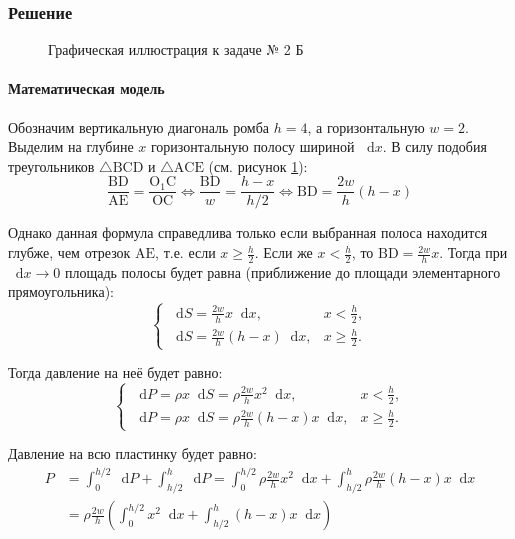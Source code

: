 \documentclass[a4paper,12pt]{article}
\newcommand*\diff{\mathop{}\!\mathrm{d}}
\begin{document}
\subsubsection{Решение}

\begin{figure}[htbp]
  \centering
  \caption{Графическая иллюстрация к задаче № 2 Б}\label{fig:2b}
\end{figure}

\paragraph{Математическая модель}

Обозначим вертикальную диагональ ромба \(h = 4\), а горизонтальную \(w = 2\).
Выделим на глубине \(x\) горизонтальную полосу шириной \(\diff x\).
В силу подобия треугольников
\(\triangle \mathrm{BCD}\) и \(\triangle \mathrm{ACE}\)
(см. рисунок \ref{fig:2b}):
\[
  \frac{\mathrm{BD}}{\mathrm{AE}} = \frac{\mathrm{O_1 C}}{\mathrm{OC}}
  \Leftrightarrow
  \frac{\mathrm{BD}}{w} = \frac{h - x}{h / 2}
  \Leftrightarrow
  \mathrm{BD} = \frac{2w}{h} (h - x)
\]

Однако данная формула справедлива только
если выбранная полоса находится глубже, чем отрезок \(\mathrm{AE}\),
т.е. если \(x \ge \frac{h}{2}\).
Если же \(x < \frac{h}{2}\), то \(\mathrm{BD} = \frac{2w}{h} x\).
Тогда при \(\diff x \to 0\) площадь полосы будет равна
(приближение до площади элементарного прямоугольника):
\begin{equation}
  \begin{cases}
    \diff S = \frac{2w}{h} x \diff x, & x < \frac{h}{2}, \\
    \diff S = \frac{2w}{h} (h - x) \diff x, & x \ge \frac{h}{2}.
  \end{cases}
\end{equation}

Тогда давление на неё будет равно:
\begin{equation}
  \begin{cases}
    \diff P = \rho x \diff S
      = \rho \frac{2w}{h} x^2 \diff x, & x < \frac{h}{2}, \\
    \diff P = \rho x \diff S
      = \rho \frac{2w}{h} (h - x) x \diff x, & x \ge \frac{h}{2}.
  \end{cases}
\end{equation}

Давление на всю пластинку будет равно:
\begin{equation}\label{eq:2b}
\begin{split}
  P &= \int_{0}^{h/2} \diff P + \int_{h/2}^{h} \diff P
    = \int_{0}^{h/2} \rho \frac{2w}{h} x^2 \diff x
     + \int_{h/2}^{h} \rho \frac{2w}{h} (h - x) x \diff x \\
    &= \rho \frac{2w}{h}
     \left(\int_{0}^{h/2} x^2 \diff x + \int_{h/2}^{h} (h - x) x \diff x\right)
\end{split}
\end{equation}
\end{document}
